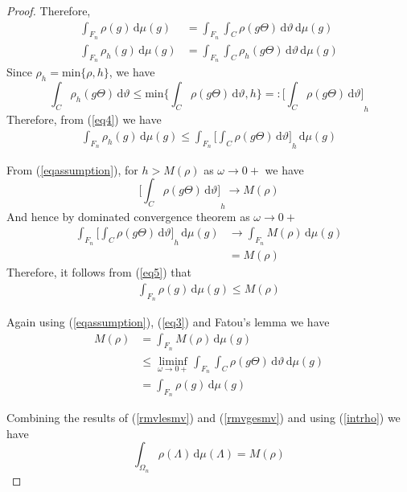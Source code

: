 \documentclass[11pt]{article}
\theoremstyle{definition}
\theoremstyle{proof}
\begin{document}
\begin{proof}
    Therefore,
    \begin{align}
        \label{eq3}
        \int_{F_n} \rho (g) \, \mathrm{d} \mu (g) &= \int_{F_n}\int_{C} \rho (g \Theta ) \, \mathrm{d} \vartheta \, \mathrm{d} \mu (g)\\
        \label{eq4}
        \int_{F_n} \rho _h(g) \, \mathrm{d} \mu (g) &= \int_{F_n}\int_{C} \rho _h(g \Theta ) \, \mathrm{d} \vartheta \, \mathrm{d} \mu (g)
    \end{align}
    Since $\rho _h = \text{min}\{\rho , h\}$, we have
    \[
        \int_{C} \rho _h(g \Theta ) \,  \mathrm{d} \vartheta \leq \text{min}\bigg\{\int_{C} \rho (g \Theta )\, \mathrm{d} \vartheta , h\bigg\} =: {\bigg[\int_{C}\rho (g \Theta )\, \mathrm{d} \vartheta \bigg]}_h
    \]
    Therefore, from (\ref{eq4}) we have
    \begin{equation}\label{eq5}
        \begin{split}
            \int_{F_n}  \rho _h(g) \, \mathrm{d} \mu (g) \leq \int_{F_n}{\bigg[\int_{C} \rho (g \Theta ) \, \mathrm{d} \vartheta \bigg]}_h \, \mathrm{d} \mu (g)
        \end{split}
    \end{equation}

    From (\ref{eqassumption}), for $h > M(\rho )$ as $\omega \to 0+$ we have
    \[
        {\bigg[\int_{C}\rho (g \Theta ) \, \mathrm{d} \vartheta \bigg]}_h  \to  M(\rho )
    \]
    And hence by dominated convergence theorem as $\omega \to 0+$
    \begin{align*}
        \int_{F_n}{\bigg[\int_{C}\rho (g \Theta ) \, \mathrm{d} \vartheta \bigg]}_h \, \mathrm{d} \mu (g)  &\to \int_{F_n} M(\rho ) \, \mathrm{d} \mu (g) \\
        &= M(\rho )
    \end{align*}
    Therefore, it follows from (\ref{eq5}) that
    \begin{align}\label{rmvlesmv}
        \int_{F_n} \rho (g) \, \mathrm{d} \mu (g) \leq M(\rho )
    \end{align}

    Again using (\ref{eqassumption}), (\ref{eq3}) and Fatou's lemma we have
    \begin{align}\label{rmvgesmv}
        M(\rho ) &= \int_{F_n} M(\rho ) \, \mathrm{d} \mu (g) \nonumber \\
        & \leq \liminf_{\omega \to 0+} \int_{F_n} \int_{C} \rho (g \Theta ) \, \mathrm{d} \vartheta \, \mathrm{d} \mu (g) \nonumber \\
        &= \int_{F_n} \rho (g) \, \mathrm{d} \mu (g)
    \end{align}

    Combining the results of (\ref{rmvlesmv}) and (\ref{rmvgesmv}) and using (\ref{intrho}) we have
    \[
        \int_{{\Omega}_n} \rho (\Lambda ) \,  \mathrm{d} \mu (\Lambda ) = M(\rho )
    \]
\end{proof}
\end{document}
